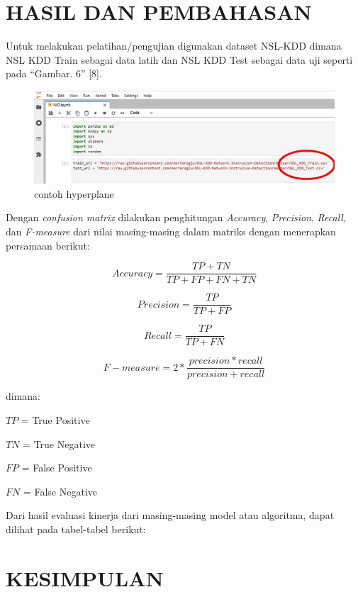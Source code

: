 \documentclass[conference]{IEEEtran}
\begin{document}
\section{HASIL DAN PEMBAHASAN}

Untuk melakukan pelatihan/pengujian digunakan dataset NSL-KDD dimana NSL KDD Train sebagai data latih dan NSL KDD Test sebagai data uji seperti pada “Gambar. 6” [8].

\begin{figure}
\centering
\includegraphics[width=.4\textwidth]{Gambar/gambaruji.jpg}
\caption{contoh hyperplane}
\end{figure}
Dengan \emph{confusion matrix} dilakukan penghitungan \emph{Accuracy}, \emph{Precision}, \emph{Recall},
dan \emph{F-measure} dari nilai masing-masing dalam matriks dengan menerapkan persamaan berikut:

\begin{equation*}
    Accuracy = \frac{TP + TN}{TP + FP + FN + TN}
    \label{eq6}
\end{equation*}

\begin{equation*}
    Precision = \frac{TP}{TP + FP}
    \label{eq7}
\end{equation*}

\begin{equation*}
    Recall = \frac{TP}{TP + FN}
    \label{eq8}
\end{equation*}

\begin{equation*}
    F-measure = 2 * \frac{precision * recall}{precision + recall}
    \label{eq9}
\end{equation*}

\noindent dimana:

\noindent $TP$ = True Positive

\noindent $TN$ = True Negative

\noindent $FP$ = False Positive

\noindent $FN$ = False Negative
\vspace{6pt}

Dari hasil evaluasi kinerja dari masing-masing model atau algoritma, dapat dilihat pada tabel-tabel berikut:


\section{KESIMPULAN}
\end{document}
